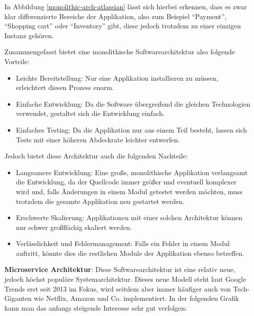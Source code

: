 In Abbildung \ref{monolithic-arch-atlassian} lässt sich hierbei erkennen, dass es zwar klar differenzierte Bereiche der Applikation, also zum Beispiel \enquote{Payment}, \enquote{Shopping cart} oder \enquote{Inventory} gibt, diese jedoch trotzdem zu einer einzigen Instanz gehören.

Zusammengefasst bietet eine monolithische Softwarearchitektur also folgende Vorteile:

\begin{itemize}
    \item Leichte Bereitstellung: Nur eine Applikation installieren zu müssen, erleichtert diesen Prozess enorm.
    \item Einfache Entwicklung: Da die Software übergreifend die gleichen Technologien verwendet, gestaltet sich die Entwicklung einfach.
    \item Einfaches Testing: Da die Applikation nur aus einem Teil besteht, lassen sich Tests mit einer höheren Abdeckrate leichter entwerfen.
\end{itemize}

Jedoch bietet diese Architektur auch die folgenden Nachteile:

\begin{itemize}
    \item Langsamere Entwicklung: Eine große, monolithische Applikation verlangsamt die Entwicklung, da der Quellcode immer größer und eventuell komplexer wird und, falls Änderungen in einem Modul getestet werden möchten, muss trotzdem die gesamte Applikation neu gestartet werden.
    \item Erschwerte Skalierung: Applikationen mit einer solchen Architektur können nur schwer großflächig skaliert werden.
    \item Verlässlichkeit und Fehlermanagement: Falls ein Fehler in einem Modul auftritt, könnte dies die restlichen Module der Applikation ebenso betreffen.
\end{itemize}


\textbf{Microservice Architektur}: Diese Softwarearchitektur ist eine relativ neue, jedoch höchst populäre Systemarchitektur. Dieses neue Modell steht laut Google Trends \cite{stats-google-microservice-trend} erst seit 2013 im Fokus, wird seitdem aber immer häufiger auch von Tech-Giganten wie Netflix, Amazon und Co. implementiert.
In der folgenden Grafik kann man das anfangs steigende Interesse sehr gut verfolgen:


